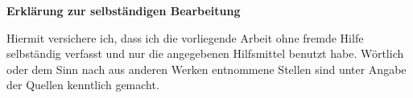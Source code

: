 \ifdefined\ISuppressStatement
\else
\clearpage
{}
\thispagestyle{plain}
\ITocEntryStatement
\textbf{\sffamily\large Erklärung zur selbständigen Bearbeitung}

Hiermit versichere ich, dass ich die vorliegende
Arbeit ohne fremde Hilfe selbständig verfasst und nur die
angegebenen Hilfsmittel benutzt habe.
Wörtlich oder dem Sinn nach aus anderen Werken entnommene Stellen sind unter
Angabe der Quellen kenntlich gemacht.

\vspace{1cm}
\noindent\makebox[3cm]{\hrulefill} \hspace{0.1cm}
    \makebox[3cm]{\hrulefill} \hspace{0.1cm}
    \makebox[6cm]{\hrulefill} \\
\noindent{} \hspace{0.1cm}
     \hspace{0.1cm}

\clearpage
\fi